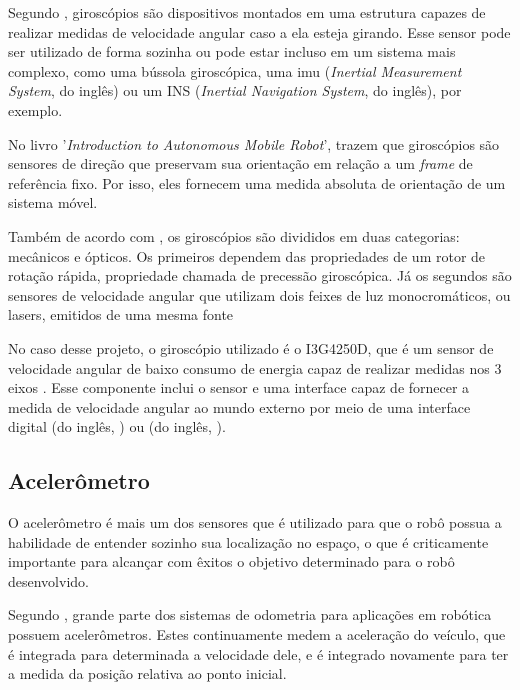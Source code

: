 \documentclass[acronym, symbols, table]{fei}
\begin{document}
				Segundo \textcite{s17102284}, giroscópios são dispositivos montados em uma estrutura capazes de realizar medidas de velocidade angular caso a ela esteja girando. Esse sensor pode ser utilizado de forma sozinha ou pode estar incluso em um sistema mais complexo, como uma bússola giroscópica, uma \acrshort{imu} (\textit{Inertial Measurement System}, do inglês) ou um INS (\textit{Inertial Navigation System}, do inglês), por exemplo.
				
				No livro '\textit{Introduction to Autonomous Mobile Robot}', \textcite{siegwart2011introduction} trazem que giroscópios são sensores de direção que preservam sua orientação em relação a um \textit{frame} de referência fixo. Por isso, eles fornecem uma medida absoluta de orientação de um sistema móvel. 
				
				Também de acordo com \textcite{siegwart2011introduction}, os giroscópios são divididos em duas categorias: mecânicos e ópticos. Os primeiros dependem das propriedades de um rotor de rotação rápida, propriedade chamada de precessão giroscópica. Já os segundos são sensores de velocidade angular que utilizam dois feixes de luz monocromáticos, ou lasers, emitidos de uma mesma fonte
				
				No caso desse projeto, o giroscópio utilizado é o I3G4250D, que é um sensor de velocidade angular de baixo consumo de energia capaz de realizar medidas nos 3 eixos \cite{datasheet_gyro}. Esse componente inclui o sensor e uma interface capaz de fornecer a medida de velocidade angular ao mundo externo por meio de uma interface digital  (do inglês, ) ou  (do inglês, ).
			
			\subsection{Acelerômetro} \label{sec:sensores_acelerometro}
			
				O acelerômetro é mais um dos sensores que é utilizado para que o robô possua a habilidade de entender sozinho sua localização no espaço, o que é criticamente importante para alcançar com êxitos o objetivo determinado para o robô desenvolvido.
			
				Segundo \textcite{NISTLER2011413}, grande parte dos sistemas de odometria para aplicações em robótica possuem acelerômetros. Estes continuamente medem a aceleração do veículo, que é integrada para determinada a velocidade dele, e é integrado novamente para ter a medida da posição relativa ao ponto inicial.
				
\end{document}
